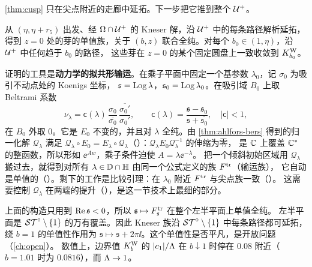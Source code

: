 \cref{thm:cusp} 只在尖点附近的走廊中延拓。下一步把它推到整个 $\mathcal U^{+}$。

\begin{proposition}\label{ch10:prop:global}
从 $(\eta,\eta+r_5)$ 出发、经 $\Omega\cap\mathcal U^{+}$ 的 Kneser 解，沿 $\mathcal U^{+}$ 中的每条路径解析延拓，
得到 $z=0$ 处的芽的单值族，关于 $(b,z)$ 联合全纯。对每个 $b_0\in(1,\eta)$，沿 $\mathcal U^{+}$ 中任何趋于 $b_0$ 的路径，
这些芽在 $z=0$ 的某个固定圆盘上一致收敛到 $K^{\mathrm W}_{b_0}$。
\end{proposition}

证明的工具是\textbf{动力学的拟共形输运}。在乘子平面中固定一个基参数 $\lambda_0$，记 $\sigma_0$ 为吸引不动点处的 Koenigs 坐标，
$\mathfrak s=\operatorname{Log}\lambda$，$\mathfrak s_0=\operatorname{Log}\lambda_0$。在吸引域 $B_0$ 上取 Beltrami 系数
\[
  \nu_\lambda=\mathsf c(\lambda)\,\frac{\sigma_0}{\overline{\sigma_0}}\,\frac{\overline{\sigma_0'}}{\sigma_0'},\qquad
  \mathsf c(\lambda)=\frac{\mathfrak s-\mathfrak s_0}{\mathfrak s+\overline{\mathfrak s_0}},\quad |\mathsf c|<1,
\]
在 $B_0$ 外取 $0$。它是 $E_0$ 不变的，并且对 $\lambda$ 全纯。由 \cref{thm:ahlfors-bers} 得到的归一化解 $\mathcal Q_\lambda$
满足 $\mathcal Q_\lambda\circ E_0=E_\lambda\circ\mathcal Q_\lambda$（\cite[命题~10.18]{KneserPaper}）：$\mathcal Q_\lambda E_0\mathcal Q_\lambda^{-1}$ 的伸缩为零，
是 $\mathbb{C}$ 上覆盖 $\mathbb{C}^*$ 的整函数，所以形如 $\ee^{Aw}$，乘子条件迫使 $A=\lambda\ee^{-\lambda}$。
把一个倾斜初始区域用 $\mathcal Q_\lambda$ 搬过去，就得到对所有 $\lambda\in\mathbb{D}\cap\mathbb{H}$ 由同一个公式定义的族 $F^{\mathrm{tr}}$（输运族），
它自动是单值的（\cite[命题~10.19]{KneserPaper}）。剩下的工作是比较引理：在 $\lambda_0$ 附近 $F^{\mathrm{tr}}$ 与尖点族一致（\cite[引理~10.21]{KneserPaper}）。
这需要控制 $\mathcal Q_\lambda$ 在两端的提升（\cite[引理~10.20]{KneserPaper}），是这一节技术上最细的部分。

\begin{remark}\label{ch10:rem:punctured}
上面的构造只用到 $\operatorname{Re}\mathfrak s<0$，所以 $\mathfrak s\mapsto F^{\mathrm{tr}}_{\mathfrak s}$ 在整个左半平面上单值全纯。
左半平面是 $\mathcal{ST}^\circ\setminus\{1\}$ 的万有覆盖。因此 Kneser 族沿 $\mathcal{ST}^\circ\setminus\{1\}$ 中每条路径都可延拓，
绕 $b=1$ 的单值性作用为 $\mathfrak s\mapsto\mathfrak s+2\pi\ii$。这个单值性是否平凡，是开放问题（\cref{ch:open}）。
数值上，边界值 $K^{\mathrm W}_b$ 的 $|c_1|/\Lambda$ 在 $b\downarrow1$ 时停在 $0.08$ 附近（$b=1.01$ 时为 $0.0816$），而 $\Lambda\to1$。
\end{remark}


